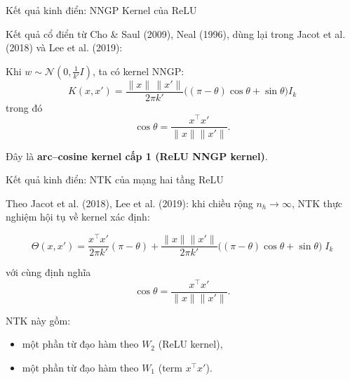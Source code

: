 \documentclass[12pt]{beamer}
\begin{document}
\begin{frame}{Kết quả kinh điển: NNGP Kernel của ReLU}

Kết quả cổ điển từ Cho \& Saul (2009), Neal (1996), dùng lại trong
Jacot et al. (2018) và Lee et al. (2019):

\vspace{0.2cm}
Khi $w \sim \mathcal N(0,\tfrac{1}{k'}I)$, ta có kernel NNGP:
\[
K(x,x')
=
\frac{\|x\|\,\|x'\|}{2\pi k'}
\Big(
(\pi - \theta)\cos\theta + \sin\theta
\Big)
I_k
\]
trong đó
\[
\cos\theta
=
\frac{x^\top x'}{\|x\|\|x'\|}.
\]

\vspace{0.2cm}
Đây là \textbf{arc--cosine kernel cấp 1 (ReLU NNGP kernel)}.
\end{frame}

\begin{frame}{Kết quả kinh điển: NTK của mạng hai tầng ReLU}

Theo Jacot et al. (2018), Lee et al. (2019):
khi chiều rộng $n_h \to \infty$, NTK thực nghiệm hội tụ về
kernel xác định:

\[
\Theta(x,x')
=
\frac{x^\top x'}{2\pi k'}(\pi - \theta)
+
\frac{\|x\|\|x'\|}{2\pi k'}
\Big(
(\pi - \theta)\cos\theta + \sin\theta
\Big)
\; I_k
\]

với cùng định nghĩa
\[
\cos\theta = \frac{x^\top x'}{\|x\|\|x'\|}.
\]

\vspace{0.2cm}
NTK này gồm:
\begin{itemize}
    \item một phần từ đạo hàm theo $W_2$ (ReLU kernel),
    \item một phần từ đạo hàm theo $W_1$ (term $x^\top x'$).
\end{itemize}

\end{frame}

\begin{frame}
    
\end{frame}
\end{document}
